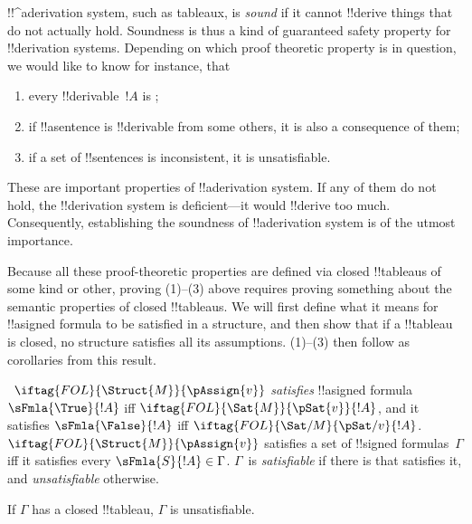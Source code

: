\documentclass[../../../include/open-logic-section]{subfiles}
\begin{document}
      {}
      {}

\begin{explain}
!!^a{derivation} system, such as tableaux, is \emph{sound}
if it cannot !!{derive} things that do not actually hold.  Soundness is
thus a kind of guaranteed safety property for !!{derivation} systems.
Depending on which proof theoretic property is in question, we would
like to know for instance, that
\begin{enumerate}
\item every !!{derivable}~$!A$ is ;
\item if !!a{sentence} is !!{derivable} from some others, it is also a
  consequence of them;
\item if a set of !!{sentence}s is inconsistent, it is unsatisfiable.
\end{enumerate}
These are important properties of !!a{derivation} system.  If any of them do
not hold, the !!{derivation} system is deficient---it would !!{derive} too much.
Consequently, establishing the soundness of !!a{derivation} system is of the
utmost importance.

Because all these proof-theoretic properties are defined via closed
!!{tableau}s of some kind or other, proving (1)--(3) above requires
proving something about the semantic properties of closed
!!{tableau}s.  We will first define what it means for !!a{signed
  formula} to be satisfied in a structure, and then show that if a
!!{tableau} is closed, no structure satisfies all its assumptions.
(1)--(3) then follow as corollaries from this result.
\end{explain}

\begin{defn}
~$\iftag{FOL}{\Struct{M}}{\pAssign{v}}$
\emph{satisfies} !!a{signed formula} $\sFmla{\True}{!A}$ iff
$\iftag{FOL}{\Sat{M}}{\pSat{v}}{!A}$, and it satisfies
$\sFmla{\False}{!A}$ iff
$\iftag{FOL}{\Sat/{M}}{\pSat/{v}}{!A}$. $\iftag{FOL}{\Struct{M}}{\pAssign{v}}$
satisfies a set of !!{signed formula}s~$\Gamma$ iff it satisfies every
$\sFmla{S}{!A} \in \Gamma$. $\Gamma$~is \emph{satisfiable} if there is
 that satisfies it, and
\emph{unsatisfiable} otherwise.
\end{defn}

\begin{thm}[Soundness]
  If $\Gamma$ has a closed !!{tableau}, $\Gamma$ is unsatisfiable.
\end{thm}
\end{document}

